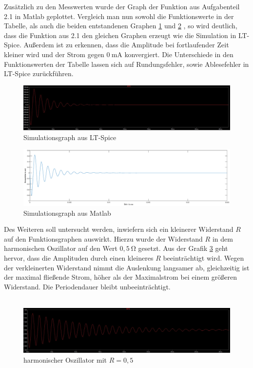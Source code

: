 Zusätzlich zu den Messwerten wurde der Graph der Funktion aus Aufgabenteil 2.1 in Matlab geplottet. Vergleich man nun sowohl die Funktionswerte in der Tabelle, als auch die beiden entstandenen Graphen \ref{lt} und \ref{mat} , so wird deutlich, dass die Funktion aus 2.1 den gleichen Graphen erzeugt wie die Simulation in LT-Spice. Außerdem ist zu erkennen, dass die Amplitude bei fortlaufender Zeit kleiner wird und der Strom gegen $0\:$\si{\milli\ampere} konvergiert. Die Unterschiede in den Funktionswerten der Tabelle lassen sich auf Rundungsfehler, sowie Ablesefehler in LT-Spice zurückführen.
\begin{figure}[h]
	\centering
	\includegraphics[width=\textwidth]{data/ltsim}
	\caption{Simulationsgraph aus LT-Spice}
	\label{lt}
\end{figure}

\begin{figure}[h!]
	\includegraphics[width=\textwidth]{data/fctmat}
	\caption{Simulationsgraph aus Matlab}
	\label{mat}
\end{figure}
\newpage
Des Weiteren soll untersucht werden, inwiefern sich ein kleinerer Widerstand $R$ auf den Funktionsgraphen auswirkt. Hierzu wurde der Widerstand $R$ in dem harmonischen Oszillator auf den Wert $0,5\:$\si{\ohm} gesetzt. Aus der Grafik \ref{14R} geht hervor, dass die Amplituden durch einen kleineres $R$ beeinträchtigt wird. Wegen der verkleinerten Widerstand nimmt die Auslenkung langsamer ab, gleichzeitig ist der maximal fließende Strom,  höher als der Maximalstrom bei einem größeren Widerstand. Die Periodendauer bleibt unbeeinträchtigt.
\\ \\
\begin{figure}[h]
	\includegraphics[width=\textwidth]{data/kleineresR}
	\caption{harmonischer Oszillator mit $R = 0,5\:$\ohm}
	\label{14R}
\end{figure}

